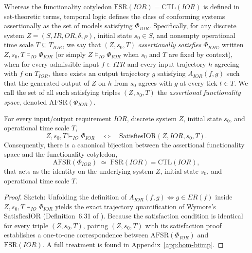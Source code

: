 Whereas the functionality cotyledon $\mathrm{FSR}(IOR)=\mathrm{CTL}(IOR)$ is defined in set-theoretic terms, temporal logic defines the class of conforming systems assertionally as the set of models satisfying $\Phi_{IOR}$. Specifically, for any discrete system $Z=(S,IR,OR,\delta,\rho)$, initial state $s_0\in S$, and nonempty operational time scale $T\subseteq T_{IOR}$, we say that $(Z,s_0,T)$ \emph{assertionally satisfies} $\Phi_{IOR}$, written $Z,s_0,T\models_{IO}\Phi_{IOR}$ (or simply $Z\models_{IO}\Phi_{IOR}$ when $s_0$ and $T$ are fixed by context), when for every admissible input $f\in ITR$ and every input trajectory $h$ agreeing with $f$ on $T_{IOR}$, there exists an output trajectory $g$ satisfying $A_{IOR}(f,g)$ such that the generated output of $Z$ on $h$ from $s_0$ agrees with $g$ at every tick $t\in T$. We call the set of all such satisfying triples $(Z,s_0,T)$ the \emph{assertional functionality space}, denoted $\mathrm{AFSR}(\Phi_{IOR})$.

\begin{theorem}
\label{thm:boundary-characteristic}
For every input/output requirement $IOR$, discrete system $Z$, initial state $s_0$, and operational time scale $T$,
\[
 Z,s_0,T\models_{IO}\Phi_{IOR}
 \quad\Longleftrightarrow\quad
 \mathrm{SatisfiesIOR}(Z,IOR,s_0,T).
\]
Consequently, there is a canonical bijection between the assertional functionality space and the functionality cotyledon,
\[
  \mathrm{AFSR}(\Phi_{IOR})\;\simeq\;\mathrm{FSR}(IOR)=\mathrm{CTL}(IOR),
\]
that acts as the identity on the underlying system $Z$, initial state $s_0$, and operational time scale $T$.
\end{theorem}

\begin{proof}
Sketch: Unfolding the definition of $A_{IOR}(f,g)\Leftrightarrow g\in ER(f)$ inside $Z,s_0,T\models_{IO}\Phi_{IOR}$ yields the exact trajectory quantification of Wymore's $\mathrm{SatisfiesIOR}$ (Definition~6.31 of \citet{Wymore1993}). Because the satisfaction condition is identical for every triple $(Z,s_0,T)$, pairing $(Z,s_0,T)$ with its satisfaction proof establishes a one-to-one correspondence between $\mathrm{AFSR}(\Phi_{IOR})$ and $\mathrm{FSR}(IOR)$. A full treatment is found in Appendix~\ref{app:hom-biimp}.
\end{proof}

